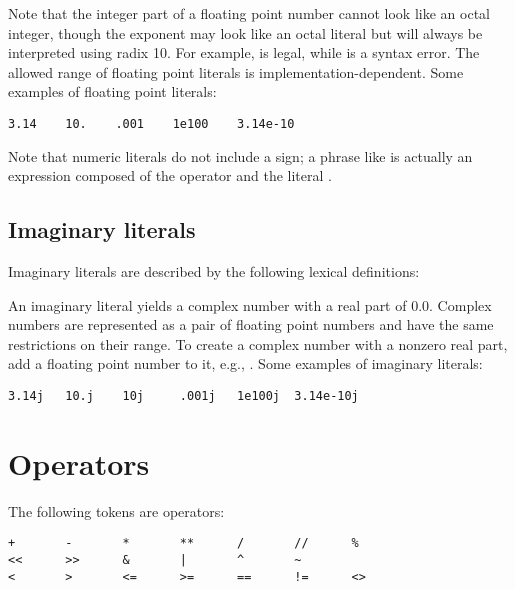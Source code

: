 Note that the integer part of a floating point number cannot look like
an octal integer, though the exponent may look like an octal literal
but will always be interpreted using radix 10.  For example,
 is legal, while  is a syntax error.
The allowed range of floating point literals is
implementation-dependent.
Some examples of floating point literals:

\begin{verbatim}
3.14    10.    .001    1e100    3.14e-10
\end{verbatim}

Note that numeric literals do not include a sign; a phrase like
 is actually an expression composed of the operator
\code{-} and the literal .


\subsection{Imaginary literals\label{imaginary}}

Imaginary literals are described by the following lexical definitions:

\begin{productionlist}
\end{productionlist}

An imaginary literal yields a complex number with a real part of
0.0.  Complex numbers are represented as a pair of floating point
numbers and have the same restrictions on their range.  To create a
complex number with a nonzero real part, add a floating point number
to it, e.g., .  Some examples of imaginary literals:

\begin{verbatim}
3.14j   10.j    10j     .001j   1e100j  3.14e-10j 
\end{verbatim}


\section{Operators\label{operators}}

The following tokens are operators:

\begin{verbatim}
+       -       *       **      /       //      %
<<      >>      &       |       ^       ~
<       >       <=      >=      ==      !=      <>
\end{verbatim}

